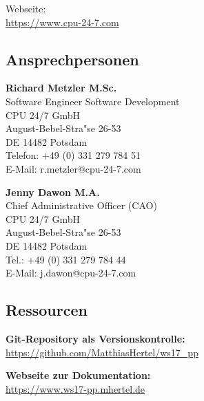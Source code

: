 \documentclass[12pt]{article}
\begin{document}
Webseite:\\
\url{https://www.cpu-24-7.com}



\subsection{Ansprechpersonen}

\textbf{Richard Metzler M.Sc.}\\
Software Engineer Software Development\\

CPU 24/7 GmbH \\
August-Bebel-Stra"se 26-53\\
DE 14482 Potsdam\\

Telefon: +49 (0) 331 279 784 51 \\
E-Mail: r.metzler@cpu-24-7.com

\bigbreak
\bigbreak
\textbf{Jenny Dawon M.A.}\\
Chief Administrative Officer (CAO)\\

CPU 24/7 GmbH\\
August-Bebel-Stra"se 26-53\\
DE 14482 Potsdam\\

Tel.: +49 (0) 331 279 784 44\\
E-Mail: j.dawon@cpu-24-7.com

\subsection{Ressourcen}
\textbf{Git-Repository als Versionskontrolle:}\\
\url{https://github.com/MatthiasHertel/ws17_pp}

\textbf{Webseite zur Dokumentation:}\\
\url{https://www.ws17-pp.mhertel.de}



\clearpage
\setlength\bibitemsep{10pt}
\renewcommand*{\bibfont}{\footnotesize}
\end{document}
